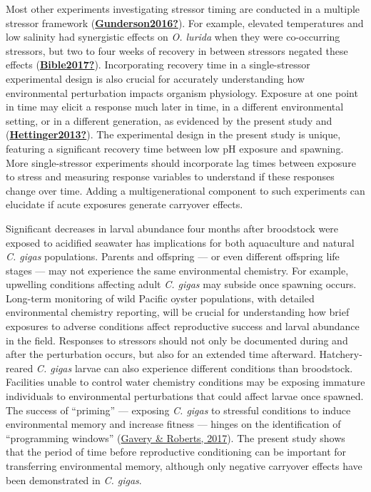 \documentclass [11pt, proquest] {uwthesis}[2015/03/03]
\begin{document}
Most other experiments investigating stressor timing are conducted in a multiple stressor framework (\protect\hyperlink{ref-Gunderson2016}{\textbf{Gunderson2016?}}). For example, elevated temperatures and low salinity had synergistic effects on \emph{O. lurida} when they were co-occurring stressors, but two to four weeks of recovery in between stressors negated these effects (\protect\hyperlink{ref-Bible2017}{\textbf{Bible2017?}}). Incorporating recovery time in a single-stressor experimental design is also crucial for accurately understanding how environmental perturbation impacts organism physiology. Exposure at one point in time may elicit a response much later in time, in a different environmental setting, or in a different generation, as evidenced by the present study and (\protect\hyperlink{ref-Hettinger2013}{\textbf{Hettinger2013?}}). The experimental design in the present study is unique, featuring a significant recovery time between low pH exposure and spawning. More single-stressor experiments should incorporate lag times between exposure to stress and measuring response variables to understand if these responses change over time. Adding a multigenerational component to such experiments can elucidate if acute exposures generate carryover effects.

Significant decreases in larval abundance four months after broodstock were exposed to acidified seawater has implications for both aquaculture and natural \emph{C. gigas} populations. Parents and offspring --- or even different offspring life stages --- may not experience the same environmental chemistry. For example, upwelling conditions affecting adult \emph{C. gigas} may subside once spawning occurs. Long-term monitoring of wild Pacific oyster populations, with detailed environmental chemistry reporting, will be crucial for understanding how brief exposures to adverse conditions affect reproductive success and larval abundance in the field. Responses to stressors should not only be documented during and after the perturbation occurs, but also for an extended time afterward. Hatchery-reared \emph{C. gigas} larvae can also experience different conditions than broodstock. Facilities unable to control water chemistry conditions may be exposing immature individuals to environmental perturbations that could affect larvae once spawned. The success of ``priming'' --- exposing \emph{C. gigas} to stressful conditions to induce environmental memory and increase fitness --- hinges on the identification of ``programming windows'' (\protect\hyperlink{ref-Gavery2017}{Gavery \& Roberts, 2017}). The present study shows that the period of time before reproductive conditioning can be important for transferring environmental memory, although only negative carryover effects have been demonstrated in \emph{C. gigas}.
\end{document}
